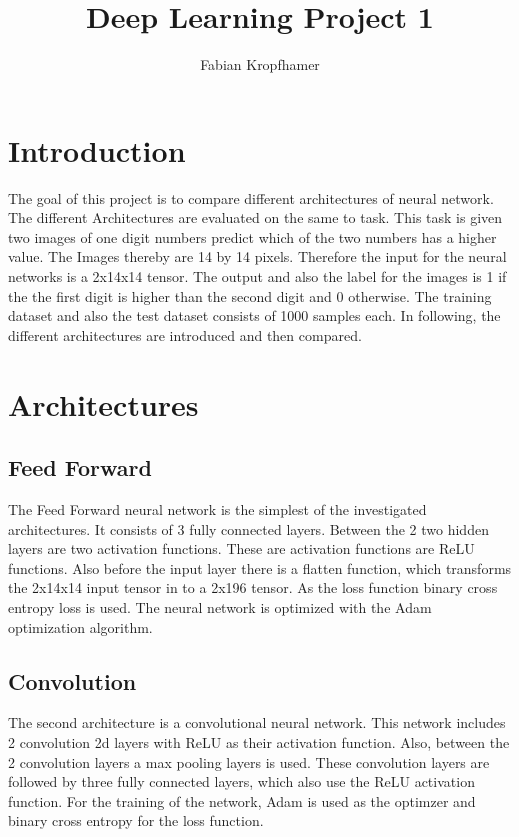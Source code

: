 \documentclass[12pt]{article}
\title{
	Deep Learning Project 1
}
\author{Fabian Kropfhamer}
\begin{document}
\maketitle

\section{Introduction}
The goal of this project is to compare different architectures of neural network.
The different Architectures are evaluated on the same to task.
This task is given two images of one digit numbers predict which of the two numbers has a higher value.
The Images thereby are 14 by 14 pixels.
Therefore the input for the neural networks is a 2x14x14 tensor.
The output and also the label for the images is 1 if the the first digit is higher than the second digit and 0 otherwise.
The training dataset and also the test dataset consists of 1000 samples each.
In following, the different architectures are introduced and then compared.  
\section{Architectures}
\subsection{Feed Forward}
The Feed Forward neural network is the simplest of the investigated architectures.
It consists of 3 fully connected layers.
Between the 2 two hidden layers are two activation functions.
These are activation functions are ReLU functions.
Also before the input layer there is a flatten function, which transforms the 2x14x14 input tensor in to a 2x196 tensor.
As the loss function binary cross entropy loss is used.
The neural network is optimized with the Adam optimization algorithm.
\subsection{Convolution}
The second architecture is a convolutional neural network.
This network includes 2 convolution 2d layers with ReLU as their activation function.
Also, between the 2 convolution layers a max pooling layers is used.
These convolution layers are followed by three fully connected layers, which also use the ReLU activation function.
For the training of the network, Adam is used as the optimzer and binary cross entropy for the loss function.
\end{document}
